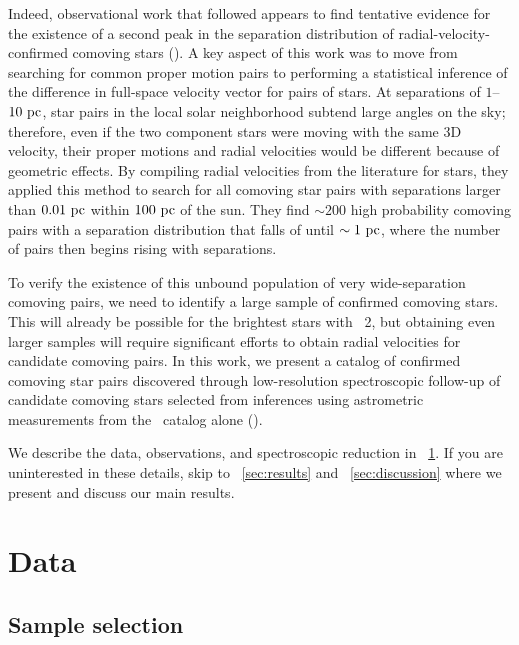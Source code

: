 \documentclass[modern, letterpaper]{aastex61}
\newcommand{\gaia}{\project{Gaia}}
\newcommand{\DR}[1]{\acronym{DR}#1}
\newcommand{\tgas}{\acronym{TGAS}}
\begin{document}
Indeed, observational work that followed appears to find tentative evidence for
the existence of a second peak in the separation distribution of
radial-velocity-confirmed comoving stars (\citealt{Shaya:2011}).
A key aspect of this work was to move from searching for common proper motion
pairs to performing a statistical inference of the difference in full-space
velocity vector for pairs of stars.
At separations of $1$--$10~\mathrm{pc}$, star pairs in the local solar neighborhood
subtend large angles on the sky; therefore, even if the two component stars were
moving with the same 3D velocity, their proper motions and radial velocities
would be different because of geometric effects.
By compiling radial velocities from the literature for 
stars, they applied this method to search for all comoving star pairs with
separations larger than $0.01~\mathrm{pc}$ within $100~\mathrm{pc}$ of the sun.
They find $\sim 200$ high probability comoving pairs with a separation
distribution that falls of until $\sim 1~\mathrm{pc}$, where the number of pairs then
begins rising with separations.

To verify the existence of this unbound population of very wide-separation
comoving pairs, we need to identify a large sample of confirmed comoving stars.
This will already be possible for the brightest stars with \gaia\ \DR{2}, but
obtaining even larger samples will require significant efforts to obtain radial
velocities for candidate comoving pairs.
In this work, we present a catalog of confirmed comoving star pairs discovered
through low-resolution spectroscopic follow-up of candidate comoving stars
selected from inferences using astrometric measurements from the \tgas\ catalog
alone (\citealt{Oh:2017}).

We describe the data, observations, and spectroscopic reduction in
\sectionname~\ref{sec:data}.
If you are uninterested in these details, skip to \sectionname~\ref{sec:results}
and \sectionname~\ref{sec:discussion} where we present and discuss our main
results.

\section{Data}\label{sec:data}

\subsection{Sample selection}\label{sec:sample}
\end{document}
